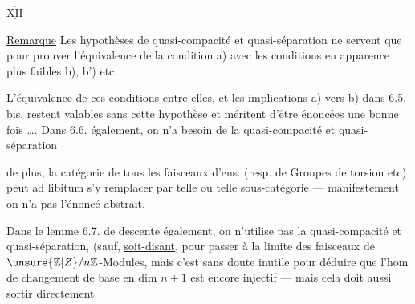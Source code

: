 $\overline{\underline{\mathrm{XII}}}$

\uline{Remarque}  Les hypothèses de quasi-compacité et quasi-séparation ne servent que pour  prouver l'équivalence de la condition a) avec les conditions en apparence plus faibles b), b') etc.

L'équivalence de ces conditions entre elles, et les implications  a)  vers b)  dans 6.5. bis, restent valables sans cette hypothèse et méritent d'être énoncées une bonne fois \ldots. Dans 6.6. également, on n'a  besoin de la quasi-compacité et quasi-séparation \unsure{;|,}

de plus, la catégorie de tous les faisceaux d'ens. (resp. de Groupes de torsion  etc) peut ad libitum s'y remplacer par telle ou telle sous-catégorie --- manifestement on n'a pas  l'énoncé  abstrait.

Dans le lemme 6.7. de descente également, on n'utilise pas la quasi-compacité et quasi-séparation, (sauf, \uline{soit-disant}, pour passer à la limite   des faisceaux de $\unsure{\mathbb Z|Z}/n\mathbb Z$-Modules, mais c'est sans doute inutile    pour déduire que l'hom de changement de base en dim $n+1$ est encore injectif --- mais cela doit aussi sortir directement.

